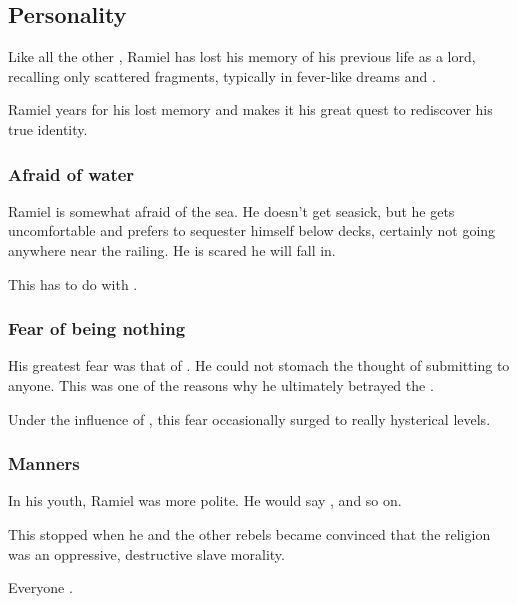 \subsection{Personality}
Like all the other \Malachim, Ramiel has lost his memory of his previous life as a \resphan{} lord, recalling only scattered fragments, typically in fever-like dreams and \deajvus. 

Ramiel years for his lost memory and makes it his great quest to rediscover his true identity.





\subsubsection{Afraid of water}
Ramiel is somewhat afraid of the sea. 
He doesn't get seasick, but he gets uncomfortable and prefers to sequester himself below decks, certainly not going anywhere near the railing. 
He is scared he will fall in. 

This has to do with . 





\subsubsection{Fear of being nothing}
His greatest fear was that of . 
He could not stomach the thought of submitting to anyone. 
This was one of the reasons why he ultimately betrayed the \banelords. 

Under the influence of , this fear occasionally surged to really hysterical levels. 





\subsubsection{Manners}
In his youth, Ramiel was more polite. 
He would say ,  and so on. 

This stopped when he and the other rebels became convinced that the \Merkyran{} religion was an oppressive, destructive slave morality. 

Everyone .





